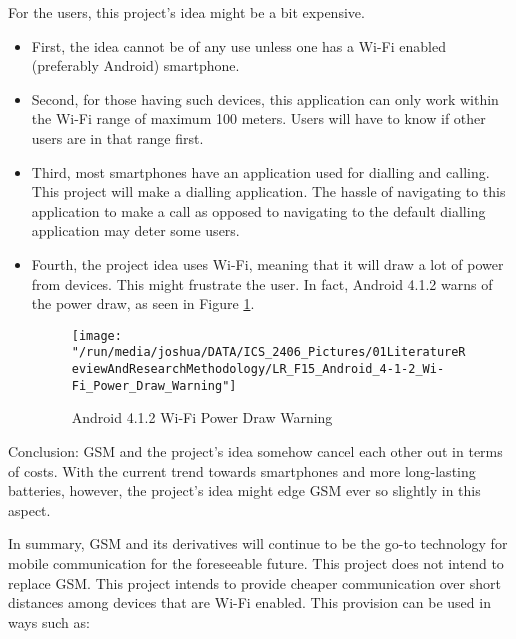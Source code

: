 \documentclass[12pt,svgnames,smaller]{article} %
\begin{document}
\begin{itemize}
\begin{itemize}
				For the users, this project’s idea might be a bit expensive. 
						
				\begin{itemize}
					\item First, the idea cannot be of any use unless one has a Wi-Fi enabled (preferably Android) smartphone. 
					\item Second, for those having such devices, this application can only work within the Wi-Fi range of maximum 100 meters. Users will have to know if other users are in that range first. 
					\item Third, most smartphones have an application used for dialling and calling. This project will make a dialling application. The hassle of navigating to this application to make a call as opposed to navigating to the default dialling application may deter some users.
					\item Fourth, the project idea uses Wi-Fi, meaning that it will draw a lot of power from devices. This might frustrate the user. In fact, Android 4.1.2 warns of the power draw, as seen in Figure \ref{fig:LiteratureReview-Figure15}.
					
					\begin{figure}
						\centering
						\texttt{[image: "/run/media/joshua/DATA/ICS\_2406\_Pictures/01LiteratureReviewAndResearchMethodology/LR\_F15\_Android\_4-1-2\_Wi-Fi\_Power\_Draw\_Warning"]}
						\caption{Android 4.1.2 Wi-Fi Power Draw Warning}
						\label{fig:LiteratureReview-Figure15}
					\end{figure}
					
				\end{itemize}
				
			\end{itemize}
		
		Conclusion: GSM and the project’s idea somehow cancel each other out in terms of costs. With the current trend towards smartphones and more long-lasting batteries, however, the project’s idea might edge GSM ever so slightly in this aspect.
		
	
	\end{itemize}
	
	In summary, GSM and its derivatives will continue to be the go-to technology for mobile communication for the foreseeable future. This project does not intend to replace GSM. This project intends to provide cheaper communication over short distances among devices that are Wi-Fi enabled. This provision can be used in ways such as:
	
\end{document}
